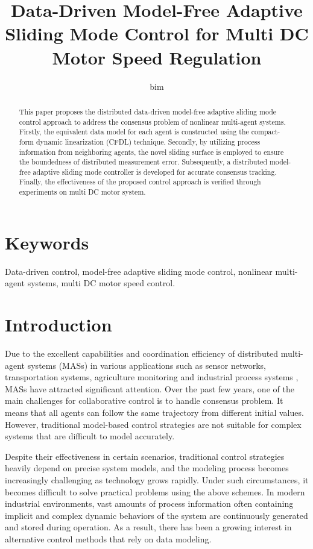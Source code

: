 \documentclass[journal,onecolumn]{IEEEtran}
\title{\LARGE Data-Driven Model-Free Adaptive Sliding Mode Control for Multi DC Motor Speed Regulation}
\author{bim}
\begin{document}
\maketitle

\begin{abstract}
    This paper proposes the distributed data-driven model-free adaptive sliding mode control approach to address the consensus problem of nonlinear multi-agent systems. Firstly, the equivalent data model for each agent is constructed using the compact-form dynamic linearization (CFDL) technique. Secondly, by utilizing process information from neighboring agents, the novel sliding surface is employed to ensure the boundedness of distributed measurement error. Subsequently, a distributed model-free adaptive sliding mode controller is developed for accurate consensus tracking. Finally, the effectiveness of the proposed control approach is verified through experiments on multi DC motor system.
\end{abstract}


\section*{Keywords}
Data-driven control, model-free adaptive sliding mode control, nonlinear multi-agent systems, multi DC motor speed control.

\section{Introduction}\label{section:1}

Due to the excellent capabilities and coordination efficiency of distributed multi-agent systems (MASs) in various applications such as sensor networks, transportation systems, agriculture monitoring and industrial process systems \cite{1,2,3}, MASs have attracted significant attention. Over the past few years, one of the main challenges for collaborative control \cite{4,5,6} is to handle consensus problem. It means that all agents can follow the same trajectory from different initial values. However, traditional model-based control strategies are not suitable for complex systems that are difficult to model accurately. 

Despite their effectiveness in certain scenarios, traditional control strategies \cite{10,11,12,13} heavily depend on precise system models, and the modeling process becomes increasingly challenging as technology grows rapidly. Under such circumstances, it becomes difficult to solve practical problems using the above schemes. In modern industrial environments, vast amounts of process information often containing implicit and complex dynamic behaviors of the system are continuously generated and stored during operation. As a result, there has been a growing interest in alternative control methods that rely on data modeling. 
\end{document}

